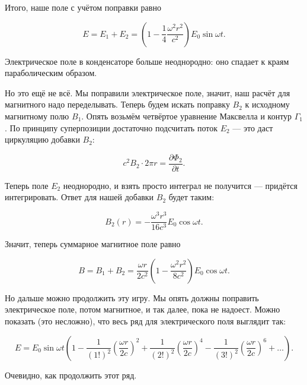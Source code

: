 \documentclass[11pt,a4paper]{article}
\numberwithin{equation}{section}
\newcommand{\pt}{\partial}
\begin{document}
Итого, наше поле с учётом поправки равно 

\begin{equation}
  \label{eq:cond_5}
  E = E_1 + E_2 = \left( 1 - \frac{1}{4}\frac{\omega^2 r^2}{c^2}
  \right) E_0 \sin \omega t. 
\end{equation}

Электрическое поле в конденсаторе больше неоднородно: оно спадает к
краям параболическим образом. 

Но это ещё не всё. Мы поправили электрическое поле, значит, наш расчёт
для магнитного надо переделывать. Теперь будем искать поправку $B_2$ к
исходному магнитному полю $B_1$. Опять возьмём четвёртое уравнение
Максвелла и контур $\Gamma_1$. По принципу суперпозиции достаточно
подсчитать поток $E_2$ --- это даст циркуляцию добавки $B_2$:

\begin{equation}
  \label{eq:cond_6}
  c^2 B_2 \cdot 2\pi r = \frac{\pt \Phi_2}{\pt t}.
\end{equation}

Теперь поле $E_2$ неоднородно, и взять просто интеграл не получится
--- придётся интегрировать. Ответ для нашей добавки $B_2$ будет таким:

\begin{equation}
  \label{eq:cond_7}
  B_2 (r) = -\frac{\omega^3 r^3}{16 c^3} E_0 \cos \omega t.
\end{equation}

Значит, теперь суммарное магнитное поле равно

\begin{equation}
  \label{eq:cond_8}
  B = B_1 + B_2 = \frac{\omega r }{2c^2} \left(1-\frac{\omega^2 r^2}{8c^2} \right) E_0 \cos \omega t.
\end{equation}

Но дальше можно продолжить эту игру. Мы опять должны поправить
электрическое поле, потом магнитное, и так далее, пока не
надоест. Можно показать (это несложно), что весь ряд для
электрического поля выглядит так: 

\begin{equation}
  \label{eq:cond_9}
  E = E_0 \sin \omega t \left( 1- \frac{1}{(1!)^2} \left( \frac{\omega
      r}{2c} \right)^2 + \frac{1}{(2!)^2} \left( \frac{\omega
      r}{2c} \right)^4 - \frac{1}{(3!)^2} \left( \frac{\omega
      r}{2c} \right)^6 + \ldots \right).
\end{equation}

Очевидно, как продолжить этот ряд. 
\end{document}
